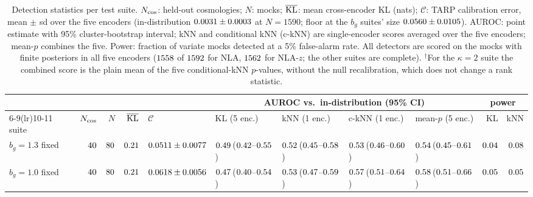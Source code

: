 \documentclass[9pt,twocolumn]{extarticle}
\newcommand{\bg}{b_g}
\newcommand{\ci}[3]{#1\,{\scriptsize(#2--#3)}}
\begin{document}
\begin{table}[tb]
\centering\scriptsize\setlength{\tabcolsep}{3.5pt}
\caption{Detection statistics per test suite. $N_{\rm cos}$: held-out cosmologies; $N$: mocks;
$\overline{\rm KL}$: mean cross-encoder KL (nats); $\mathcal{C}$: TARP calibration error, mean $\pm$ sd over
the five encoders (in-distribution $0.0031\pm0.0003$ at $N=1590$; floor at the $\bg$
suites' size $0.0560\pm0.0105$). AUROC: point estimate with 95\% cluster-bootstrap
interval; kNN and conditional kNN (c-kNN) are single-encoder scores averaged over the five encoders;
mean-$p$ combines the five. Power: fraction of variate mocks detected at a 5\% false-alarm rate. All detectors are
scored on the mocks with finite posteriors in all five encoders ($1558$ of $1592$ for NLA,
$1562$ for NLA-$z$; the other suites are complete). $^\dagger$For the $\kappa=2$ suite the
combined score is the plain mean of the five conditional-kNN $p$-values, without the null
recalibration, which does not change a rank statistic.}
\label{tab:main}
\begin{tabular}{lrrrlllllrr}
\toprule
& & & & & \multicolumn{4}{c}{AUROC vs.\ in-distribution (95\% CI)} & \multicolumn{2}{c}{power}\\
\cmidrule(lr){6-9}\cmidrule(lr){10-11}
suite & $N_{\rm cos}$ & $N$ & $\overline{\rm KL}$ & $\mathcal{C}$ & KL (5 enc.) & kNN (1 enc.) & c-kNN (1 enc.) & mean-$p$ (5 enc.) & KL & kNN\\
\midrule
$\bg=1.3$ fixed & $40$ & $80$ & $0.21$ & $0.0511\pm0.0077$ & \ci{$0.49$}{$0.42$}{$0.55$} & \ci{$0.52$}{$0.45$}{$0.58$} & \ci{$0.53$}{$0.46$}{$0.60$} & \ci{$0.54$}{$0.45$}{$0.61$} & $0.04$ & $0.08$\\
$\bg=1.0$ fixed & $40$ & $80$ & $0.21$ & $0.0618\pm0.0056$ & \ci{$0.47$}{$0.40$}{$0.54$} & \ci{$0.53$}{$0.47$}{$0.59$} & \ci{$0.57$}{$0.51$}{$0.64$} & \ci{$0.58$}{$0.51$}{$0.66$} & $0.05$ & $0.05$\\

\end{tabular}
\end{table}
\end{document}

